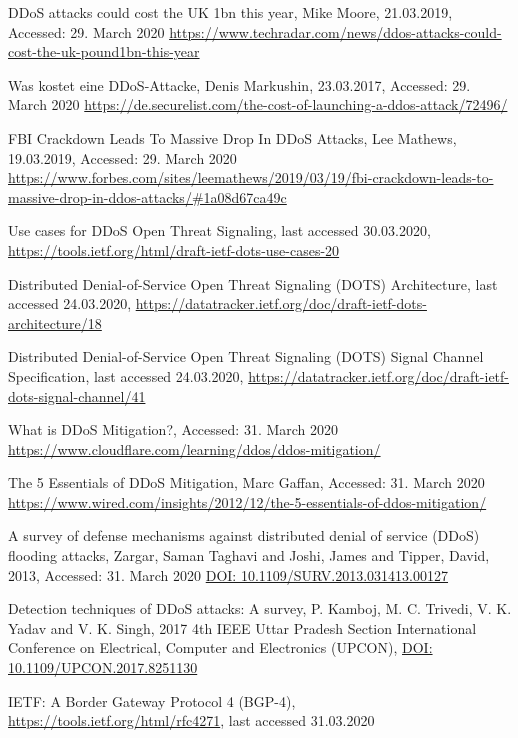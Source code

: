 \begin{thebibliography}{99}
DDoS attacks could cost the UK \£1bn this year, Mike Moore, 21.03.2019, Accessed: 29. March 2020 \url{https://www.techradar.com/news/ddos-attacks-could-cost-the-uk-pound1bn-this-year}

Was kostet eine DDoS-Attacke, Denis Markushin, 23.03.2017, Accessed: 29. March 2020 \url{https://de.securelist.com/the-cost-of-launching-a-ddos-attack/72496/}

FBI Crackdown Leads To Massive Drop In DDoS Attacks, Lee Mathews, 19.03.2019, Accessed: 29. March 2020 \url{https://www.forbes.com/sites/leemathews/2019/03/19/fbi-crackdown-leads-to-massive-drop-in-ddos-attacks/#1a08d67ca49c}

 Use cases for DDoS Open Threat Signaling, last accessed 30.03.2020, \url{https://tools.ietf.org/html/draft-ietf-dots-use-cases-20}

 Distributed Denial-of-Service Open Threat Signaling (DOTS) Architecture, last accessed 24.03.2020, \url{https://datatracker.ietf.org/doc/draft-ietf-dots-architecture/18}

 Distributed Denial-of-Service Open Threat Signaling (DOTS) Signal Channel Specification, last accessed 24.03.2020,
\url{https://datatracker.ietf.org/doc/draft-ietf-dots-signal-channel/41}

What is DDoS Mitigation?, Accessed: 31. March 2020 \url{https://www.cloudflare.com/learning/ddos/ddos-mitigation/}

The 5 Essentials of DDoS Mitigation, Marc Gaffan, Accessed: 31. March 2020 \url{https://www.wired.com/insights/2012/12/the-5-essentials-of-ddos-mitigation/}

A survey of defense mechanisms against distributed denial of service (DDoS) flooding attacks, Zargar, Saman Taghavi and Joshi, James and Tipper, David, 2013, Accessed: 31. March 2020 \url{DOI: 10.1109/SURV.2013.031413.00127}

Detection techniques of DDoS attacks: A survey, P. Kamboj, M. C. Trivedi, V. K. Yadav and V. K. Singh, 2017 4th IEEE Uttar Pradesh Section International Conference on Electrical, Computer and Electronics (UPCON), \url{DOI: 10.1109/UPCON.2017.8251130}

 IETF: A Border Gateway Protocol 4 (BGP-4), \url{https://tools.ietf.org/html/rfc4271}, last accessed 31.03.2020


\end{thebibliography}
